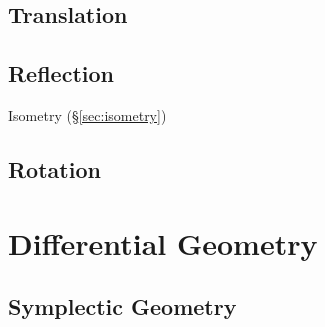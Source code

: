 \subsection{Translation}\label{sec:translation}

\subsection{Reflection}\label{sec:reflection}

Isometry (\S\ref{sec:isometry})



\subsection{Rotation}\label{sec:rotation}



\section{Differential Geometry}\label{sec:differential_geometry}

\subsection{Symplectic Geometry}\label{sec:symplectic_geometry}
